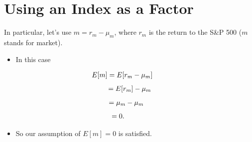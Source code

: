 \documentclass[letterpaper,10pt,english]{sphinxmanual}
\begin{document}
\section{Using an Index as a Factor}
\label{indexModels:id4}
In particular, let's use $m = r_m - \mu_m$, where $r_m$ is
the return to the S\&P 500 ($m$ stands for market).
\begin{itemize}
\item {} 
In this case

\end{itemize}
\begin{gather}
\begin{split}E[m] & = E[r_m - \mu_m] \quad\end{split}\notag
\end{gather}\begin{gather}
\begin{split}& \quad = E[r_m] - \mu_m \,\end{split}\notag
\end{gather}\begin{gather}
\begin{split}& = \mu_m - \mu_m \,\end{split}\notag
\end{gather}\begin{gather}
\begin{split}& = 0. \qquad \enspace\end{split}\notag
\end{gather}\begin{itemize}
\item {} 
So our assumption of $E[m] = 0$ is satisfied.

\end{itemize}
\end{document}
